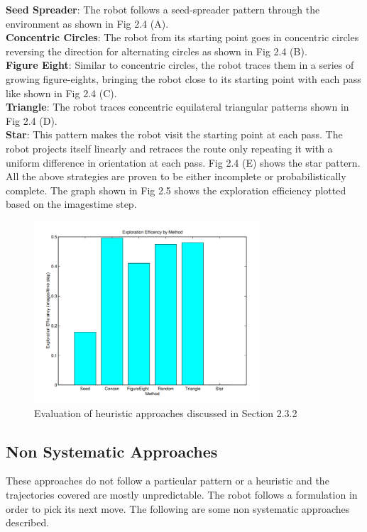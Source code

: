 \noindent \textbf{Seed Spreader}: The robot follows a seed-spreader pattern through the environment\cite{27} as shown in Fig 2.4 (A).\\
\noindent \textbf{Concentric Circles}: The robot from its starting point goes in concentric circles reversing the direction for alternating circles as shown in Fig 2.4 (B).\\ 
\noindent\textbf{Figure Eight}: Similar to concentric circles, the robot traces them in a series of growing figure-eights, bringing the robot close to its starting point with each pass like shown in Fig 2.4 (C).\\ \noindent \textbf{Triangle}: The robot traces concentric equilateral triangular patterns shown in Fig 2.4 (D).\\ 
\noindent \textbf{Star}: This pattern makes the robot visit the starting point at each pass. The robot projects itself linearly and retraces the route only repeating it with a uniform difference in orientation at each pass. Fig 2.4 (E) shows the star pattern.\\

All the above strategies are proven to be either incomplete or probabilistically complete. The graph shown in Fig 2.5 shows the exploration efficiency plotted based on the images\/time step\cite{26}.

\begin{figure}
    \centering
    \includegraphics[width=0.75\textwidth]{images/expoeff.png}
    \caption{Evaluation of heuristic approaches discussed in Section 2.3.2}
    \label{fig:my_label}
\end{figure}

\subsection{Non Systematic Approaches}
These approaches do not follow a particular pattern or a heuristic and the trajectories covered are mostly unpredictable. The robot follows a formulation in order to pick its next move. The following are some non systematic approaches described.

